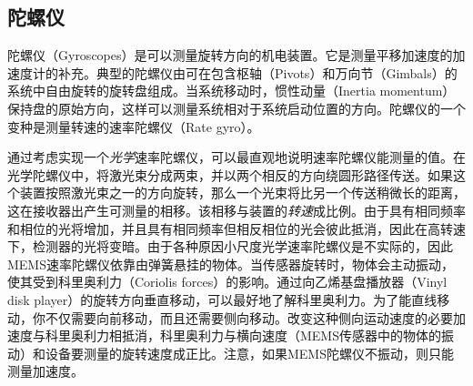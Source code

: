 \subsection{陀螺仪}
陀螺仪（Gyroscopes）是可以测量旋转方向的机电装置。它是测量平移加速度的加速度计的补充。典型的陀螺仪由可在包含枢轴（Pivots）和万向节（Gimbals）的系统中自由旋转的旋转盘组成。当系统移动时，惯性动量（Inertia momentum）保持盘的原始方向，这样可以测量系统相对于系统启动位置的方向。陀螺仪的一个变种是测量转速的速率陀螺仪（Rate gyro）。


通过考虑实现一个\emph{光学}速率陀螺仪，可以最直观地说明速率陀螺仪能测量的值。在光学陀螺仪中，将激光束分成两束，并以两个相反的方向绕圆形路径传送。如果这个装置按照激光束之一的方向旋转，那么一个光束将比另一个传送稍微长的距离，这在接收器出产生可测量的相移。该相移与装置的\emph{转速}成比例。由于具有相同频率和相位的光将增加，并且具有相同频率但相反相位的光会彼此抵消，因此在高转速下，检测器的光将变暗。由于各种原因小尺度光学速率陀螺仪是不实际的，因此MEMS速率陀螺仪依靠由弹簧悬挂的物体。当传感器旋转时，物体会主动振动，使其受到科里奥利力（Coriolis forces）的影响。通过向乙烯基盘播放器（Vinyl disk player）的旋转方向垂直移动，可以最好地了解科里奥利力。为了能直线移动，你不仅需要向前移动，而且还需要侧向移动。改变这种侧向运动速度的必要加速度与科里奥利力相抵消，科里奥利力与横向速度（MEMS传感器中的物体的振动）和设备要测量的旋转速度成正比。注意，如果MEMS陀螺仪不振动，则只能测量加速度。

